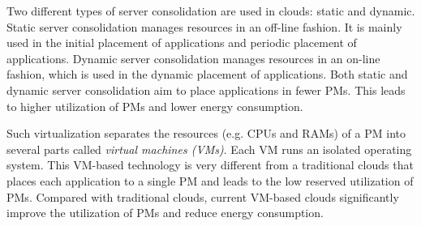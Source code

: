 
 Two different types of
server consolidation are used in clouds: static and dynamic. Static server consolidation manages resources in an off-line fashion. It is mainly 
used in the initial placement of applications and periodic placement of applications. Dynamic server consolidation manages resources in 
an on-line fashion, which is used in the dynamic placement of applications. Both static and dynamic server consolidation aim to place
applications in fewer PMs. This leads to higher utilization of PMs and lower energy consumption.



Such virtualization separates the resources (e.g. CPUs and RAMs) of a PM into several parts called \emph{virtual machines (VMs)}. 
Each VM runs an isolated operating system. This VM-based technology is very different from a 
traditional clouds that places each application to a single PM and leads to the low reserved utilization of PMs. 
Compared with traditional clouds, current VM-based clouds significantly improve the utilization of PMs and reduce energy consumption.

